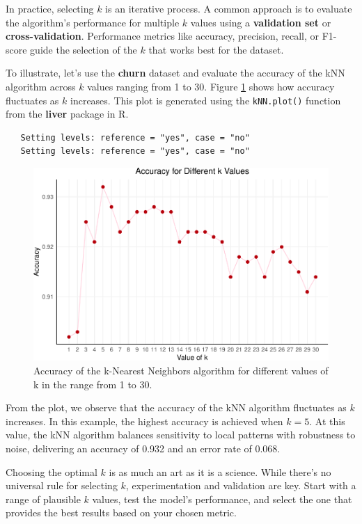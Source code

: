 \documentclass[
]{book}
\newcommand{\passthrough}[1]{#1}
\theoremstyle{definition}
\theoremstyle{definition}
\theoremstyle{definition}
\theoremstyle{definition}
\theoremstyle{remark}
\begin{document}
In practice, selecting \(k\) is an iterative process. A common approach is to evaluate the algorithm's performance for multiple \(k\) values using a \textbf{validation set} or \textbf{cross-validation}. Performance metrics like accuracy, precision, recall, or F1-score guide the selection of the \(k\) that works best for the dataset.

To illustrate, let's use the \textbf{churn} dataset and evaluate the accuracy of the kNN algorithm across \(k\) values ranging from 1 to 30. Figure \ref{fig:kNN-plot} shows how accuracy fluctuates as \(k\) increases. This plot is generated using the \passthrough{\lstinline!kNN.plot()!} function from the \textbf{liver} package in R.

\begin{lstlisting}
   Setting levels: reference = "yes", case = "no"
   Setting levels: reference = "yes", case = "no"
\end{lstlisting}

\begin{figure}

{\centering \includegraphics[width=0.85\linewidth]{knn_files/figure-latex/kNN-plot-1} 

}

\caption{Accuracy of the k-Nearest Neighbors algorithm for different values of k in the range from 1 to 30.}\label{fig:kNN-plot}
\end{figure}

From the plot, we observe that the accuracy of the kNN algorithm fluctuates as \(k\) increases. In this example, the highest accuracy is achieved when \(k = 5\). At this value, the kNN algorithm balances sensitivity to local patterns with robustness to noise, delivering an accuracy of 0.932 and an error rate of 0.068.

Choosing the optimal \(k\) is as much an art as it is a science. While there's no universal rule for selecting \(k\), experimentation and validation are key. Start with a range of plausible \(k\) values, test the model's performance, and select the one that provides the best results based on your chosen metric.
\end{document}
